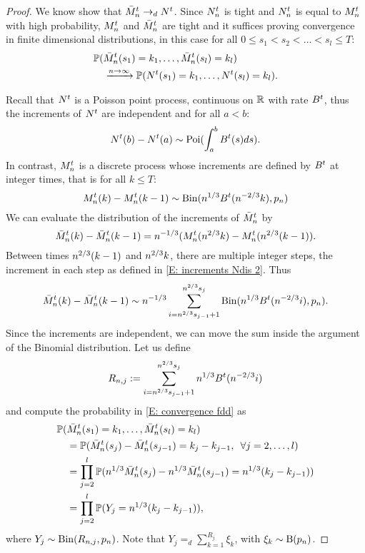 \begin{proof}
We know show that $\bar{M}_n^t \rightarrow_d N^t$.
Since $N_n^t$ is tight and $N_n^t$ is equal to $M_n^t$ with high probability,
$M_n^t$ and $\bar{M}_n^t$ are tight and it suffices proving convergence in finite dimensional distributions,
in this case for all $0 \leq s_1 < s_2 < \dots < s_l \leq T$:
\begin{equation} \label{E: convergence fdd}
\begin{aligned}
&\mathbb{P}( \bar{M}_n^t(s_1) = k_1, \dots, \bar{M}_n^t(s_l) = k_l ) \\
&\quad \xrightarrow{n \rightarrow \infty}  \mathbb{P}( N^t(s_1) = k_1, \dots, N^t(s_l) = k_l ).
\end{aligned}
\end{equation}

Recall that $N^t$ is a Poisson point process, continuous on $\mathbb{R}$ with rate $B^t$,
thus the increments of $N^t$ are independent and for all $a<b$: 
\begin{equation}
N^t(b) - N^t(a) \sim \operatorname*{Poi}( \int_{a}^{b} B^t(s)ds).
\end{equation}
In contrast, $M_n^t$ is a discrete process whose increments are defined by $B^t$ at integer times, 
that is for all $k \leq T$: 
\begin{equation} \label{E: increments Ndis 2}
M_n^t(k) - M_n^t(k-1) \sim \operatorname*{Bin}(n^{1 / 3}B^t(n^{-2 / 3}k), p_n)
\end{equation}
We can evaluate the distribution of the increments of $\bar{M}_n^t$ by
\begin{equation}
\bar{M}_n^t(k) - \bar{M}_n^t(k-1) = n^{-1 / 3}( M_n^t(n^{2 / 3}k) - M_n^t(n^{2 / 3}(k-1)).
\end{equation}
Between times $n^{2 / 3}(k-1)$ and $n^{2 / 3}k$, there are multiple integer steps,
the increment in each step as defined in \eqref{E: increments Ndis 2}. 
Thus
\begin{equation}
\bar{M}_n^t(k) - \bar{M}_n^t(k-1) \sim n^{-1 / 3} \sum_{i=n^{2 / 3}s_{j-1}+1}^{n^{2 / 3}s_j} \operatorname*{Bin}( n^{1 / 3}B^t(n^{-2 / 3}i), p_n ).
\end{equation}
Since the increments are independent, we can move the sum inside the argument of the Binomial distribution.
Let us define 
\begin{equation*}
R_{n,j} := \sum_{i=n^{2 / 3}s_{j-1}+1}^{n^{2 / 3}s_j}n^{1 / 3}B^t(n^{-2 / 3}i)
\end{equation*}
and compute the probability in \eqref{E: convergence fdd} as
\begin{equation} \label{E: distribution Ndis}
\begin{aligned}
&\mathbb{P}(\bar{M}_n^t(s_1) = k_1, \dots, \bar{M}_n^t(s_l) = k_l) \\
&\quad = \mathbb{P}( \bar{M}_n^t(s_j) - \bar{M}_n^t(s_{j-1}) = k_j - k_{j-1}, \enspace \forall j=2,\dots,l ) \\
&\quad = \prod_{j=2}^{l} \mathbb{P}( n^{1 / 3}\bar{M}_n^t(s_j) - n^{1 / 3}\bar{M}_n^t(s_{j-1}) = n^{1 / 3}(k_j - k_{j-1})) \\
&\quad = \prod_{j=2}^{l} \mathbb{P}( Y_j = n^{1 / 3}(k_j - k_{j-1}) ),
\end{aligned}
\end{equation}
where $Y_j \sim \operatorname*{Bin}(R_{n,j}, p_n)$.
Note that $Y_j =_d \sum_{k=1}^{R_j} \xi_k$, with $\xi_k \sim \operatorname*{B}(p_n)$.


\end{proof}
